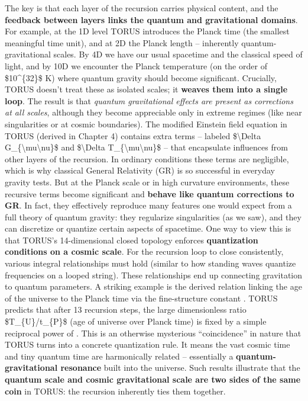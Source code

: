 \documentclass[
]{article}
\begin{document}
The key is that each layer of the recursion carries physical content,
and the \textbf{feedback between layers links the quantum and
gravitational domains}. For example, at the 1D level TORUS introduces
the Planck time (the smallest meaningful time unit), and at 2D the
Planck length -- inherently quantum-gravitational scales. By 4D we have
our usual spacetime and the classical speed of light, and by 10D we
encounter the Planck temperature (on the order of \$10\^{}\{32\}\$ K)
where quantum gravity should become significant. Crucially, TORUS
doesn't treat these as isolated scales; it \textbf{weaves them into a
single loop}. The result is that \emph{quantum gravitational effects are
present as corrections at all scales}, although they become appreciable
only in extreme regimes (like near singularities or at cosmic
boundaries). The modified Einstein field equation in TORUS (derived in
Chapter 4) contains extra terms -- labeled \$\textbackslash Delta
G\_\{\textbackslash mu\textbackslash nu\}\$ and \$\textbackslash Delta
T\_\{\textbackslash mu\textbackslash nu\}\$ -- that encapsulate
influences from other layers of the recursion\hspace{0pt}. In ordinary
conditions these terms are negligible, which is why classical General
Relativity (GR) is so successful in everyday gravity tests. But at the
Planck scale or in high curvature environments, these recursive terms
become significant and \textbf{behave like quantum corrections to GR}.
In fact, they effectively reproduce many features one would expect from
a full theory of quantum gravity: they regularize singularities (as we
saw), and they can discretize or quantize certain aspects of spacetime.
One way to view this is that TORUS's 14-dimensional closed topology
enforces \textbf{quantization conditions on a cosmic scale}. For the
recursion loop to close consistently, various integral relationships
must hold (similar to how standing waves quantize frequencies on a
looped string). These relationships end up connecting gravitation to
quantum parameters. A striking example is the derived relation linking
the age of the universe to the Planck time via the fine-structure
constant \alpha. TORUS predicts that after 13 recursion steps, the large
dimensionless ratio \$T\_\{U\}/t\_\{P\}\$ (age of universe over Planck
time) is fixed by a simple reciprocal power of \alpha\hspace{0pt}. This is an
otherwise mysterious ``coincidence'' in nature that TORUS turns into a
concrete quantization rule. It means the vast cosmic time and tiny
quantum time are harmonically related -- essentially a
\textbf{quantum-gravitational resonance} built into the universe. Such
results illustrate that the \textbf{quantum scale and cosmic
gravitational scale are two sides of the same coin} in TORUS: the
recursion inherently ties them together.
\end{document}

